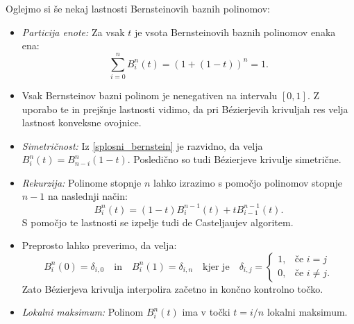 \documentclass[12pt,a4paper,twoside]{article}
\theoremstyle{definition} %
\theoremstyle{plain} %
\theoremstyle{primerstyle}
\numberwithin{equation}{section}  %
\newcommand{\R}{\mathbb R}
\newcommand{\cV}{\mathbf{c}}
\newcommand{\rV}{\mathbf{r}}
\begin{document}
Oglejmo si še nekaj lastnosti Bernsteinovih baznih polinomov:
\begin{itemize}
	\item \emph{Particija enote:} Za vsak $t$ je vsota Bernsteinovih baznih polinomov enaka ena:
	$$\sum_{i=0}^nB_i^n(t)=(1+(1-t))^n=1.$$
	\item Vsak Bernsteinov bazni polinom je nenegativen na intervalu $[0,1].$ Z uporabo te in prejšnje lastnosti vidimo, da pri Bézierjevih krivuljah res velja lastnost konveksne ovojnice.
	\item \emph{Simetričnost:} Iz \eqref{splosni_bernstein} je razvidno, da velja $B_i^n(t)=B_{n-i}^n(1-t).$ Posledično so tudi Bézierjeve krivulje simetrične.
	\item \emph{Rekurzija:} Polinome stopnje $n$ lahko izrazimo s pomočjo polinomov stopnje $n-1$ na naslednji način:
	$$B_i^n(t)=(1-t)B_i^{n-1}(t)+tB_{i-1}^{n-1}(t).$$
	S pomočjo te lastnosti se izpelje tudi de Casteljaujev algoritem.
	\item Preprosto lahko preverimo, da velja:
	$$B_i^n(0)=\delta_{i,0}\quad\text{in}\quad B_i^n(1)=\delta_{i,n}\quad\text{kjer je}\quad \delta_{i,j}=\begin{cases}
										   		1, & \text{če } i=j\\
										   		0, & \text{če } i\neq j.
										   \end{cases}$$
	Zato Bézierjeva krivulja interpolira začetno in končno kontrolno točko.
	\item \emph{Lokalni maksimum:} Polinom $B_i^n(t)$ ima v točki $t=i/n$ lokalni maksimum.
\end{itemize}

\end{document}
